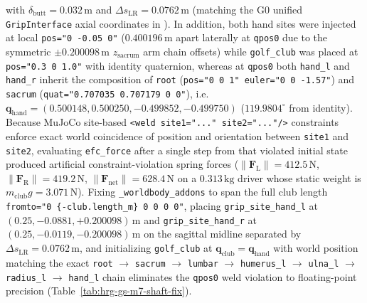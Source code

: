 \documentclass[11pt,a4paper]{article}
\begin{document}
with $\delta_{\mathrm{butt}} = 0.032\,\mathrm{m}$ and $\Delta s_{\mathrm{LR}} = 0.0762\,\mathrm{m}$ (matching the G0 unified \texttt{GripInterface} axial coordinates in ). In addition, both hand sites were injected at local \texttt{pos="0 -0.05 0"} ($0.400196\,\mathrm{m}$ apart laterally at \texttt{qpos0} due to the symmetric $\pm 0.200098\,\mathrm{m}$ $z_{\mathrm{sacrum}}$ arm chain offsets) while \texttt{golf\_club} was placed at \texttt{pos="0.3 0 1.0"} with identity quaternion, whereas at \texttt{qpos0} both \texttt{hand\_l} and \texttt{hand\_r} inherit the composition of \texttt{root} (\texttt{pos="0 0 1" euler="0 0 -1.57"}) and \texttt{sacrum} (\texttt{quat="0.707035 0.707179 0 0"}), i.e.\ $\mathbf{q}_{\mathrm{hand}} = (0.500148, 0.500250, -0.499852, -0.499750)$ ($119.9804^{\circ}$ from identity). Because MuJoCo site-based \texttt{<weld site1="..." site2="..."/>} constraints enforce exact world coincidence of position and orientation between \texttt{site1} and \texttt{site2}, evaluating \texttt{efc\_force} after a single step from that violated initial state produced artificial constraint-violation spring forces ($\|\mathbf{F}_{\mathrm{L}}\| = 412.5\,\mathrm{N}$, $\|\mathbf{F}_{\mathrm{R}}\| = 419.2\,\mathrm{N}$, $\|\mathbf{F}_{\mathrm{net}}\| = 628.4\,\mathrm{N}$ on a $0.313\,\mathrm{kg}$ driver whose static weight is $m_{\mathrm{club}} g = 3.071\,\mathrm{N}$). Fixing \texttt{\_worldbody\_addons} to span the full club length \texttt{fromto="0 \{-club.length\_m\} 0 0 0 0"}, placing \texttt{grip\_site\_hand\_l} at $(0.25, -0.0881, +0.200098)\,\mathrm{m}$ and \texttt{grip\_site\_hand\_r} at $(0.25, -0.0119, -0.200098)\,\mathrm{m}$ on the sagittal midline separated by $\Delta s_{\mathrm{LR}} = 0.0762\,\mathrm{m}$, and initializing \texttt{golf\_club} at $\mathbf{q}_{\mathrm{club}} = \mathbf{q}_{\mathrm{hand}}$ with world position matching the exact \texttt{root} $\to$ \texttt{sacrum} $\to$ \texttt{lumbar} $\to$ \texttt{humerus\_l} $\to$ \texttt{ulna\_l} $\to$ \texttt{radius\_l} $\to$ \texttt{hand\_l} chain eliminates the \texttt{qpos0} weld violation to floating-point precision (Table~\ref{tab:hrg-gs-m7-shaft-fix}).
\end{document}
